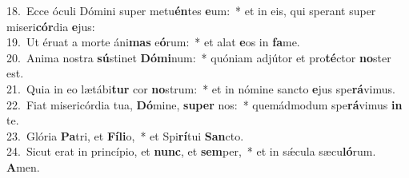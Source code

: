 {18.~}Ecce óculi Dómini super metu\textbf{én}tes \textbf{e}um:~* et in eis, qui sperant super miseri\textbf{cór}dia \textbf{e}jus:\\
{19.~}Ut éruat a morte áni\textbf{mas} e\textbf{ó}rum:~* et alat \textbf{e}os in \textbf{fa}me.\\
{20.~}Anima nostra \textbf{sú}stinet \textbf{Dó}\textbf{mi}num:~* quóniam adjútor et pro\textbf{té}ctor \textbf{no}ster est.\\
{21.~}Quia in eo lætábi\textbf{tur} cor \textbf{no}strum:~* et in nómine sancto \textbf{e}jus spe\textbf{rá}vimus.\\
{22.~}Fiat misericórdia tua, \textbf{Dó}mine, \textbf{su}\textbf{per} nos:~* quemádmodum spe\textbf{rá}vimus \textbf{in} te.\\
{23.~}Glória \textbf{Pa}tri, et \textbf{Fí}\textbf{li}o,~* et Spi\textbf{rí}tui \textbf{San}cto.\\
{24.~}Sicut erat in princípio, et \textbf{nunc}, et \textbf{sem}per,~* et in sǽcula sæcu\textbf{ló}rum. \textbf{A}men.\\
